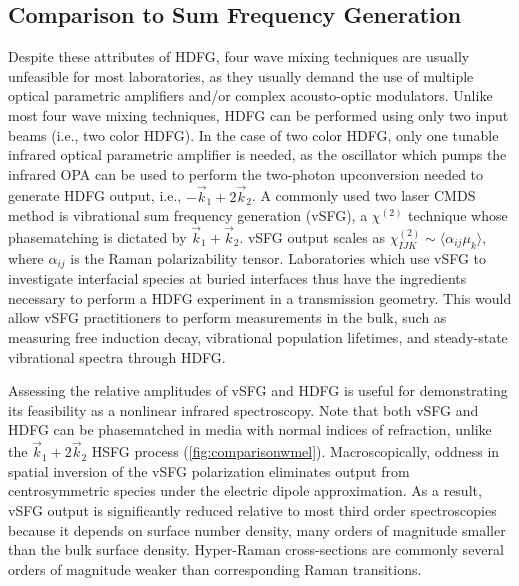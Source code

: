 \documentclass[aip, jcp, reprint, onecolumn]{revtex4-2}
\begin{document}
\subsection{Comparison to Sum Frequency Generation}
Despite these attributes of HDFG, four wave mixing techniques are usually unfeasible for most laboratories, as they usually demand the use of multiple optical parametric amplifiers and/or complex acousto-optic modulators. \cite{RN245}  %
Unlike most four wave mixing techniques, HDFG can be performed using only two input beams (i.e., two color HDFG).
In the case of two color HDFG, only one tunable infrared optical parametric amplifier is needed, as the oscillator which pumps the infrared OPA can be used to perform the two-photon upconversion needed to generate HDFG output, i.e., $-\vec{k}_1 + 2\vec{k}_2$.
A commonly used two laser CMDS method is vibrational sum frequency generation (vSFG), a $\chi^{(2)}$ technique whose phasematching is dictated by $\vec{k}_1 + \vec{k}_2$.
vSFG output scales as $\chi^{(2)}_{IJK} \sim \langle \alpha_{ij} \mu_k \rangle$, where $\alpha_{ij}$ is the Raman polarizability tensor.
Laboratories which use vSFG to investigate interfacial species at buried interfaces thus have the ingredients necessary to perform a HDFG experiment in a transmission geometry. \cite{Piontek2023_1}
This would allow vSFG practitioners to perform measurements in the bulk, such as measuring free induction decay, vibrational population lifetimes, and steady-state vibrational spectra through HDFG.
 
Assessing the relative amplitudes of vSFG and HDFG is useful for demonstrating its feasibility as a nonlinear infrared spectroscopy. 
Note that both vSFG and HDFG can be phasematched in media with normal indices of refraction, unlike the $\vec{k}_1 + 2\vec{k}_2$ HSFG process (\autoref{fig:comparisonwmel}).\cite{RN120}
Macroscopically, oddness in spatial inversion of the vSFG polarization eliminates output from centrosymmetric species under the electric dipole approximation.\cite{RN132, RN133}
As a result, vSFG output is significantly reduced relative to most third order spectroscopies because it depends on surface number density, many orders of magnitude smaller than the bulk surface density. 
Hyper-Raman cross-sections are commonly several orders of magnitude weaker than corresponding Raman transitions.\cite{RN515}
\end{document}
